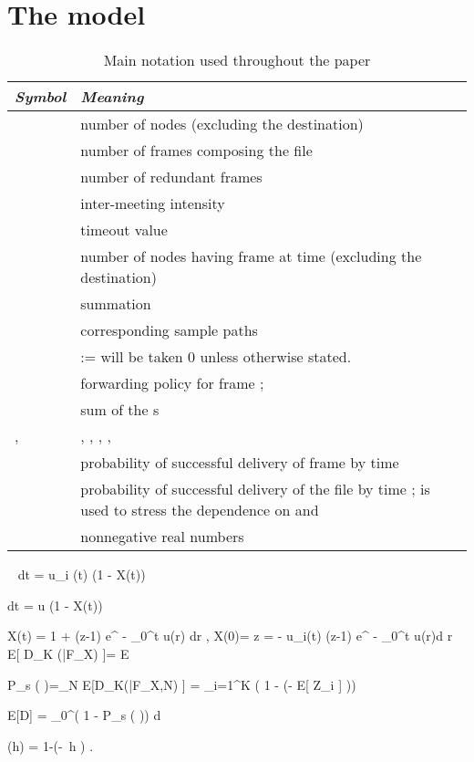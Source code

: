 \documentclass[10pt,twocolumn,conference,final]{IEEEtran}
\newcommand{\eF}{\mathcal F_{\mathbf X}}
\begin{document}
\section{The model}\label{sec:model}
\begin{table}[t]\caption{Main notation used throughout the paper}
\centering
\begin{tabular}{|p{}|p{}|}
\hline
{\it Symbol} & {\it Meaning}\\
\hline
 & number of nodes (excluding the destination)\\
 & number of frames composing the file\\
 & number of redundant frames\\
 & inter-meeting intensity\\
 & timeout value\\
 & number of nodes having frame  at time  (excluding the destination) \\
 & summation \\
 & corresponding sample paths\\
 & := will be taken 0 unless otherwise stated.\\
 & forwarding policy for frame ;  \\
 & sum of the s \\
,&, , , , \\
& probability of successful delivery of frame  by time \\
& probability of successful delivery of the file by time ;  is
used to stress the dependence on  and \\
 & nonnegative real numbers \\
\hline
\end{tabular}\
 { dt} = u_i (t) \lambda (1 - X(t))
\label{dyn1}

 { dt} = \lambda u (1 - X(t))
\label{dyn2}

\label{all}
X(t) = 1 + (z-1) e^{ - \lambda \int_0^t u(r) dr }, \quad X(0)= z
\label{dyn4}
 = - u_i(t) \lambda
(z-1) e^{ - \lambda \int_0^t u(r)d r }
\label{eq:expectation}
E[ D_K (\tau |\eF) ]= E \left[ \prod_{i=1}^K ( 1 - \exp (- \lambda  \widehat Z_i )) \right]

P_s ( \tau )=\lim_{N \to \infty} E[D_K(\tau|\eF,N) ]
= \prod_{i=1}^K ( 1 - \exp (- \lambda   E[ \widehat Z_i ] ))

E[D] = \int_0^\infty ( 1 - P_s ( \tau )) d \tau

\zeta(h) = 1-\exp(-\lambda\,  h  ) .


\end{table}
\end{document}
